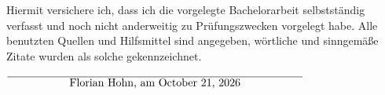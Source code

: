 \documentclass[12pt,oneside,a4paper,parskip]{scrbook}
\def\BaAuthor{Florian Hohn}
\begin{document}


\printbibliography
{}				



Hiermit versichere ich, dass ich die vorgelegte Bachelorarbeit selbstständig verfasst und noch nicht anderweitig zu Prüfungszwecken vorgelegt habe. Alle benutzten Quellen und Hilfsmittel sind angegeben, wörtliche und sinngemäße Zitate wurden als solche gekennzeichnet.

\vspace{20pt}
\begin{flushright}
$\overline{~~~~~~~~~~~~~~~~~\mbox{\BaAuthor, am \today}~~~~~~~~~~~~~~~~~}$
\end{flushright}
\end{document}
